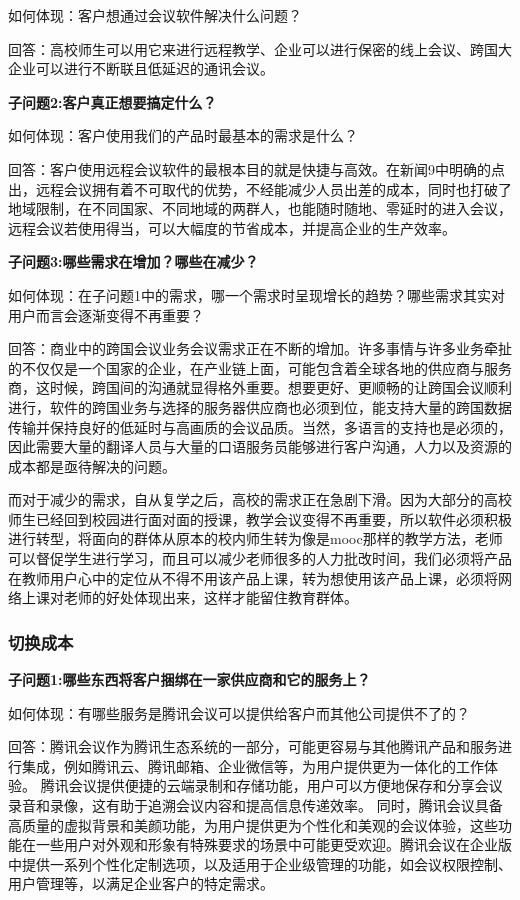 \documentclass[a4paper,12pt]{article}
\begin{document}
    如何体现：客户想通过会议软件解决什么问题？

    回答：⾼校师⽣可以⽤它来进⾏远程教学、企业可以进⾏保密的线上会议、跨国⼤企业可以进⾏不断联且低延迟的通讯会议。
    
    \textbf{子问题2:客户真正想要搞定什么？}

    如何体现：客户使⽤我们的产品时最基本的需求是什么？

    回答：客户使⽤远程会议软件的最根本⽬的就是快捷与⾼效。在新闻9中明确的点出，远程会议拥有着不可取代的优势，不经能减少⼈员出差的成本，同时也打破了地域限制，在不同国家、不同地域的两群⼈，也能随时随地、零延时的进⼊会议，远程会议若使⽤得当，可以⼤幅度的节省成本，并提⾼企业的⽣产效率。

    \textbf{子问题3:哪些需求在增加？哪些在减少？}

    如何体现：在⼦问题1中的需求，哪⼀个需求时呈现增⻓的趋势？哪些需求其实对⽤户⽽⾔会逐渐变得不再重要？

    回答：商业中的跨国会议业务会议需求正在不断的增加。许多事情与许多业务牵扯的不仅仅是⼀个国家的企业，在产业链上⾯，可能包含着全球各地的供应商与服务商，这时候，跨国间的沟通就显得格外重要。想要更好、更顺畅的让跨国会议顺利进⾏，软件的跨国业务与选择的服务器供应商也必须到位，能⽀持⼤量的跨国数据传输并保持良好的低延时与⾼画质的会议品质。当然，多语⾔的⽀持也是必须的，因此需要⼤量的翻译⼈员与⼤量的⼝语服务员能够进⾏客户沟通，⼈⼒以及资源的成本都是亟待解决的问题。
    
    而对于减少的需求，⾃从复学之后，⾼校的需求正在急剧下滑。因为⼤部分的⾼校师⽣已经回到校园进⾏⾯对⾯的授课，教学会议变得不再重要，所以软件必须积极进⾏转型，将⾯向的群体从原本的校内师⽣转为像是mooc那样的教学⽅法，⽼师可以督促学⽣进⾏学习，⽽且可以减少⽼师很多的⼈⼒批改时间，我们必须将产品在教师⽤户⼼中的定位从不得不⽤该产品上课，转为想使⽤该产品上课，必须将⽹络上课对⽼师的好处体现出来，这样才能留住教育群体。
    
    \subsubsection{切换成本}
    \textbf{子问题1:哪些东西将客户捆绑在一家供应商和它的服务上？}

    如何体现：有哪些服务是腾讯会议可以提供给客户⽽其他公司提供不了的？

    回答：腾讯会议作为腾讯生态系统的一部分，可能更容易与其他腾讯产品和服务进行集成，例如腾讯云、腾讯邮箱、企业微信等，为用户提供更为一体化的工作体验。
    腾讯会议提供便捷的云端录制和存储功能，用户可以方便地保存和分享会议录音和录像，这有助于追溯会议内容和提高信息传递效率。
    同时，腾讯会议具备高质量的虚拟背景和美颜功能，为用户提供更为个性化和美观的会议体验，这些功能在一些用户对外观和形象有特殊要求的场景中可能更受欢迎。腾讯会议在企业版中提供一系列个性化定制选项，以及适用于企业级管理的功能，如会议权限控制、用户管理等，以满足企业客户的特定需求。
\end{document}
